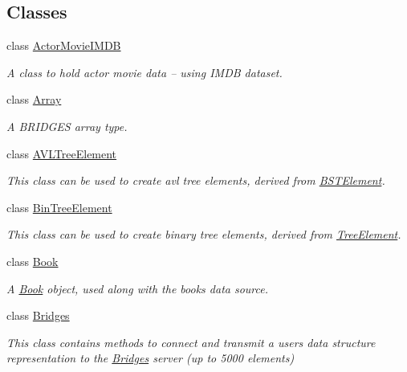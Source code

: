 \subsection*{Classes}
\begin{DoxyCompactItemize}
\item 
class \hyperlink{classbridges_1_1_actor_movie_i_m_d_b}{Actor\+Movie\+I\+M\+D\+B}
\begin{DoxyCompactList}\small\item\em A class to hold actor movie data -- using I\+M\+D\+B dataset. \end{DoxyCompactList}\item 
class \hyperlink{classbridges_1_1_array}{Array}
\begin{DoxyCompactList}\small\item\em A B\+R\+I\+D\+G\+E\+S array type. \end{DoxyCompactList}\item 
class \hyperlink{classbridges_1_1_a_v_l_tree_element}{A\+V\+L\+Tree\+Element}
\begin{DoxyCompactList}\small\item\em This class can be used to create avl tree elements, derived from \hyperlink{classbridges_1_1_b_s_t_element}{B\+S\+T\+Element}. \end{DoxyCompactList}\item 
class \hyperlink{classbridges_1_1_bin_tree_element}{Bin\+Tree\+Element}
\begin{DoxyCompactList}\small\item\em This class can be used to create binary tree elements, derived from \hyperlink{classbridges_1_1_tree_element}{Tree\+Element}. \end{DoxyCompactList}\item 
class \hyperlink{classbridges_1_1_book}{Book}
\begin{DoxyCompactList}\small\item\em A \hyperlink{classbridges_1_1_book}{Book} object, used along with the books data source. \end{DoxyCompactList}\item 
class \hyperlink{classbridges_1_1_bridges}{Bridges}
\begin{DoxyCompactList}\small\item\em This class contains methods to connect and transmit a user\textquotesingle{}s data structure representation to the \hyperlink{classbridges_1_1_bridges}{Bridges} server (up to 5000 elements) \end{DoxyCompactList}\item 

\end{DoxyCompactItemize}
